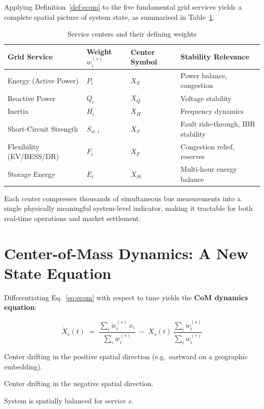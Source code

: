 \documentclass[12pt, a4paper]{article}
\begin{document}
Applying Definition~\ref{def:ecom} to the five fundamental grid services
yields a complete spatial picture of system state, as summarised in
Table~\ref{tab:centers}.

\begin{table}[htbp]
  \centering
  \caption{Service centers and their defining weights}
  \label{tab:centers}
  \begin{tabular}{llll}
    \toprule
    \textbf{Grid Service} & \textbf{Weight $w_i^{(s)}$} & \textbf{Center Symbol}
      & \textbf{Stability Relevance} \\
    \midrule
    Energy (Active Power) & $P_i$      & $X_E$ & Power balance, congestion \\
    Reactive Power        & $Q_i$      & $X_Q$ & Voltage stability \\
    Inertia               & $H_i$      & $X_H$ & Frequency dynamics \\
    Short-Circuit Strength& $S_{sc,i}$ & $X_S$ & Fault ride-through, IBR stability \\
    Flexibility (EV/BESS/DR) & $F_i$  & $X_F$ & Congestion relief, reserves \\
    Storage Energy        & $E_i$      & $X_{St}$ & Multi-hour energy balance \\
    \bottomrule
  \end{tabular}
\end{table}

Each center compresses thousands of simultaneous bus measurements into a single
physically meaningful system-level indicator, making it tractable for both
real-time operations and market settlement.

\section{Center-of-Mass Dynamics: A New State Equation}
\label{sec:ecom_dynamics}

Differentiating Eq.~\eqref{eq:ecom} with respect to time yields the
\textbf{CoM dynamics equation}:

\begin{equation}
  \dot{X}_s(t) \;=\;
  \frac{\displaystyle\sum_{i} \dot{w}_i^{(s)}\, x_i}
       {\displaystyle\sum_{i} w_i^{(s)}}
  \;-\;
  X_s(t)\,\frac{\displaystyle\sum_{i} \dot{w}_i^{(s)}}
               {\displaystyle\sum_{i} w_i^{(s)}}
  \label{eq:ecom_dynamics}
\end{equation}

\begin{description}[leftmargin=2em]
  \item[$\dot{X}_s > 0$] Center drifting in the positive spatial direction
        (e.g.\ eastward on a geographic embedding).
  \item[$\dot{X}_s < 0$] Center drifting in the negative spatial direction.
  \item[$\dot{X}_s = 0$] System is spatially balanced for service $s$.
\end{description}
\end{document}
